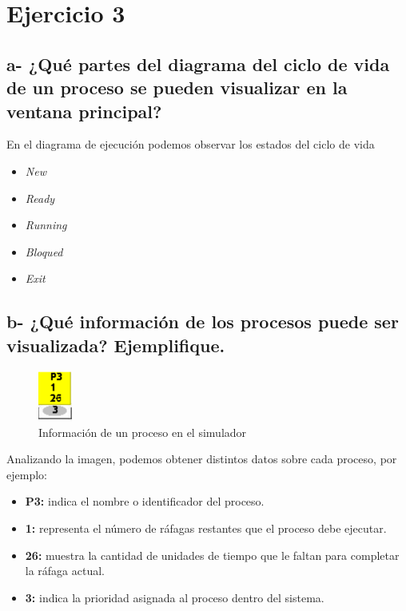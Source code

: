 \documentclass{article}
\begin{document}

\section*{Ejercicio 3}

\subsection*{a- ¿Qué partes del diagrama del ciclo de vida de un proceso se pueden visualizar en la ventana
principal?}

\noindent
En el diagrama de ejecución podemos observar los estados del ciclo de vida

\begin{itemize}
  \item \textit{New}
  \item \textit{Ready}
  \item \textit{Running}
  \item \textit{Bloqued}
  \item \textit{Exit}
\end{itemize}

\subsection*{b- ¿Qué información de los procesos puede ser visualizada? Ejemplifique.}
\begin{figure}[h]
  \centering
  \includegraphics[width=0.1\textwidth]{resources/3b.png}
  \caption{Información de un proceso en el simulador}
\end{figure}

\noindent
Analizando la imagen, podemos obtener distintos datos sobre cada proceso, por ejemplo:

\begin{itemize}
  \item \textbf{P3:} indica el nombre o identificador del proceso.
  \item \textbf{1:} representa el número de ráfagas restantes que el proceso debe ejecutar.
  \item \textbf{26:} muestra la cantidad de unidades de tiempo que le faltan para completar la ráfaga actual.
  \item \textbf{3:} indica la prioridad asignada al proceso dentro del sistema.
\end{itemize}
\end{document}
